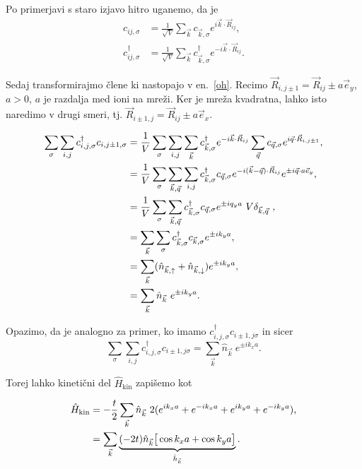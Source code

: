 \documentclass[a4paper, 12pt]{article}
\newcommand{\vq}{
	\ensuremath{\vec{q}}
}
\renewcommand{\u}{
	\ensuremath{\uparrow}
}
\renewcommand{\d}{
	\ensuremath{\downarrow}
}
\newcommand{\oh}{
	\ensuremath{\hat{h}}
}
\newcommand{\vk}{
	\ensuremath{\vec{k}}
}
\newcommand{\koren}{
	\ensuremath{\frac{1}{\sqrt{V}}}
}
\newcommand{\vR}{
	\ensuremath{\vec{R}_{ij}}
}
\newcommand{\s}{
	\ensuremath{\sigma}
}
\newcommand{\ey}{
	\ensuremath{\vec{e}_y}
}
\newcommand{\fV}{
	\ensuremath{\frac{1}{V}}
}
\renewcommand{\ni}{
	\noindent
}
\begin{document}
\ni Po primerjavi s staro izjavo hitro uganemo, da je
\begin{align}
	c_{ij,\sigma} &= \koren \sum_{\vk} c_{\vk,\sigma} e^{i\vk\cdot\vec{R}_{ij}}, \\
	c^\dagger_{ij,\sigma} &= \koren \sum_{\vk} c^\dagger_{\vk, \sigma} e^{-i\vk\cdot\vec{R}_{ij}}.
\end{align}

\ni Sedaj transformirajmo \v clene ki nastopajo v en.~\eqref{oh}. Recimo $\vec{R}_{i,j\pm1} = \vec{R}_{ij}
\pm a\vec{e}_y$, $a > 0$, $a$ je razdalja med ioni na mre\v zi. Ker je mre\v za kvadratna, lahko
isto naredimo v drugi smeri, tj. $\vec{R}_{i\pm1, j} = \vec{R}_{ij} \pm a\vec{e}_x$.

\begin{align}
	\sum_\s\sum_{i,j} c^\dagger_{i,j,\sigma}c_{i,j \pm 1,\sigma} 
	&=\fV \sum_\s\sum_{i,j}\sum_{\vk} c^\dagger_{\vk,\s} e^{-i\vk \cdot \vR}
		\sum_{\vq}c_{\vq,\s} e^{i\vq\cdot\vec{R}_{i,j \pm 1}}, \notag \\
	&=\fV \sum_\s \sum_{\vk,\vq} \sum_{i,j}c^\dagger_{\vk,\s} c_{\vq,\s} e^{-i(\vk - \vq)\cdot \vR}
		e^{\pm i\vq \cdot a \ey}, \notag \\
	&=\fV \sum_\s \sum_{\vk, \vq} c^\dagger_{\vk, \s} c_{\vq, \s} e^{\pm i q_y a}\ 
		V \delta_{\vk,\vq}\ ,\notag \\
	&= \sum_{\vk} \sum_\s c^\dagger_{\vk, \s} c_{\vk, \s} e^{\pm ik_y a}, \notag \\
	&= \sum_{\vk} (\hat{n}_{\vk,\u} + \hat{n}_{\vk,\d})e^{\pm ik_y a}, \notag \\
	&= \sum_{\vk} \hat{n}_{\vk}\ e^{\pm ik_y a}.
\end{align}

\ni Opazimo, da je analogno za primer, ko imamo $c^\dagger_{i,j,\s} c_{i\pm 1,j\s}$ in sicer
\begin{equation}
	\sum_\s \sum_{i,j} c^\dagger_{i,j,\s} c_{i\pm 1,j\s} = \sum_{\vk}
		\hat{n}_{\vk}\ e^{\pm ik_x a}.
\end{equation}

\ni Torej lahko kineti\v cni del $\hat{H}_\text{kin}$ zapi\v semo kot

\begin{align}
	\hat{H}_\text{kin} &= -\frac{t}{2} \sum_{\vk} \hat{n}_{\vk}\ 2(e^{ik_xa} + e^{-ik_xa} +
		e^{ik_ya} + e^{-ik_ya}), \notag \\
	&= \sum_{\vk} \underbrace{(-2t) \hat{n}_{\vk} \big[\cos k_xa + \cos k_ya \big]}_{\oh_{\vk}}.
\end{align}
\end{document}
